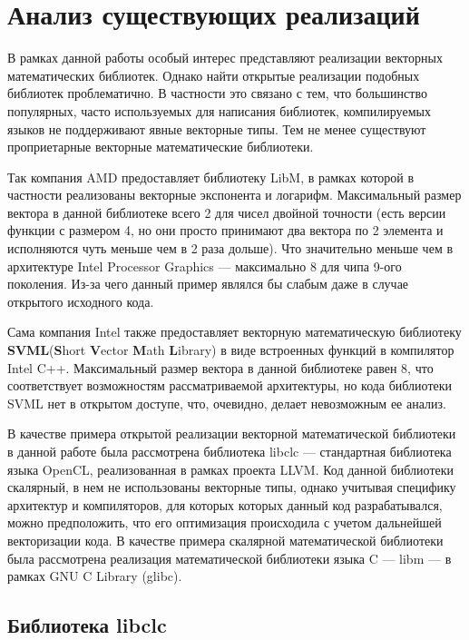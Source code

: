 
\chapter{Анализ существующих реализаций}

В рамках данной работы особый интерес представляют реализации векторных математических библиотек.
Однако найти открытые реализации подобных библиотек проблематично. 
В частности это связано с тем, что большинство популярных, часто используемых для написания библиотек, компилируемых языков не поддерживают явные векторные типы.
Тем не менее существуют проприетарные векторные математические библиотеки.

Так компания AMD предоставляет библиотеку LibM, в рамках которой в частности реализованы векторные экспонента и логарифм\cite[с.~189, 195]{amd-math}.
Максимальный размер вектора в данной библиотеке всего 2 для чисел двойной точности (есть версии функции с размером 4, но они просто принимают два вектора по 2 элемента и исполняются чуть меньше чем в 2 раза дольше). 
Что значительно меньше чем в архитектуре \foreignlanguage{english}{Intel Processor Graphics} --- максимально 8 для чипа 9-ого поколения.
Из-за чего данный пример являлся бы слабым даже в случае открытого исходного кода.

Сама компания Intel также предоставляет векторную математическую библиотеку \textbf{SVML}(\foreignlanguage{english}{\textbf{S}hort \textbf{V}ector \textbf{M}ath \textbf{L}ibrary}) в виде встроенных функций в компилятор Intel C++.
Максимальный размер вектора в данной библиотеке равен 8, что соответствует возможностям рассматриваемой архитектуры, но кода библиотеки SVML нет в открытом доступе, что, очевидно, делает невозможным ее анализ.

В качестве примера открытой реализации векторной математической библиотеки в данной работе была рассмотрена библиотека libclc --- стандартная библиотека языка OpenCL, реализованная в рамках проекта LLVM.
Код данной библиотеки скалярный, в нем не использованы векторные типы, однако учитывая специфику архитектур и компиляторов, для которых которых данный код разрабатывался, можно предположить, что его оптимизация происходила с учетом дальнейшей векторизации кода.
В качестве примера скалярной математической библиотеки была рассмотрена реализация математической библиотеки языка C --- libm --- в рамках GNU C Library (glibc).

\section{Библиотека libclc}

